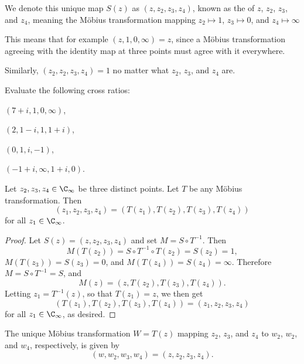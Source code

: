 We denote this unique map $S(z)$ as $(z, z_2, z_3, z_4)$, known as the  of $z$, $z_2$, $z_3$, and $z_4$, meaning the Möbius transformation mapping $z_2 \mapsto 1$, $z_3 \mapsto 0$, and $z_4 \mapsto \infty$

\begin{example}
	This means that for example $(z, 1, 0, \infty) = z$, since a Möbius transformation agreeing with the identity map at three points must agree with it everywhere.

	Similarly, $(z_2, z_2, z_3, z_4) = 1$ no matter what $z_2$, $z_3$, and $z_4$ are.
\end{example}

\begin{exercise}
	Evaluate the following cross ratios:
	\begin{parts}
		\item $(7 + i, 1, 0, \infty)$,
		\item $(2, 1-i, 1, 1+i)$,
		\item $(0, 1, i, -1)$,
		\item $(-1+i, \infty, 1+i, 0)$. \qedhere
	\end{parts}
\end{exercise}

\begin{proposition}\label{prop2.4}
	Let $z_2, z_3, z_4 \in \C_\infty$ be three distinct points.
	Let $T$ be any Möbius transformation.
	Then
	\[
		(z_1, z_2, z_3, z_4) = (T(z_1), T(z_2), T(z_3), T(z_4))
	\]
	for all $z_1 \in \C_\infty$.
\end{proposition}

\begin{proof}
	Let $S(z) = (z, z_2, z_3, z_4)$ and set $M = S \circ T^{-1}$.
	Then
	\[
		M(T(z_2)) = S \circ T^{-1} \circ T (z_2) = S(z_2) = 1,
	\]
	$M(T(z_3)) = S(z_3) = 0$, and $M(T(z_4)) = S(z_4) = \infty$.
	Therefore $M = S \circ T^{-1} = S$, and
	\[
		M(z) = (z, T(z_2), T(z_3), T(z_4)).
	\]
	Letting $z_1 = T^{-1}(z)$, so that $T(z_1) = z$, we then get
	\[
		(T(z_1), T(z_2), T(z_3), T(z_4)) = (z_1, z_2, z_3, z_4)
	\]
	for all $z_1 \in \C_\infty$, as desired.
\end{proof}

\begin{corollary}\label{cor2.5}
	The unique Möbius transformation $W = T(z)$ mapping $z_2$, $z_3$, and $z_4$ to $w_2$, $w_2$, and $w_4$, respectively, is given by
	\[
		(w, w_2, w_3, w_4) = (z, z_2, z_3, z_4).
	\]
\end{corollary}

